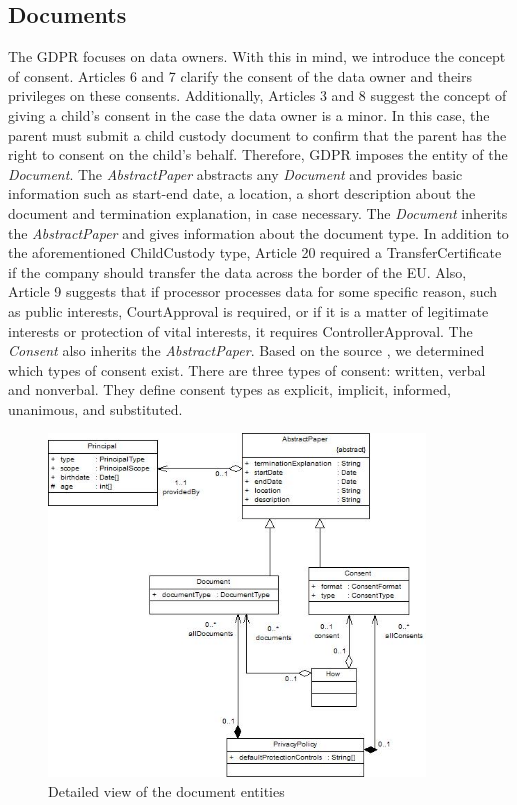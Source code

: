 \documentclass[11pt,english]{article}
\begin{document}
\subsection{Documents}
The GDPR focuses on data owners. With this in mind, we introduce the concept of consent. Articles 6 and 7 clarify the consent of the data owner and theirs privileges on these consents. Additionally, Articles 3 and 8 suggest the concept of giving a child's consent in the case the data owner is a minor. In this case, the parent must submit a child custody document to confirm that the parent has the right to consent on the child's behalf. Therefore, GDPR imposes the entity of the \emph{Document}. \newline The \emph{AbstractPaper} abstracts any \emph{Document} and provides basic information such as start-end date,  a location, a short description about the document and termination explanation, in case necessary. \newline  The \emph{Document} inherits the \emph{AbstractPaper} and gives information about the document type. In addition to the aforementioned ChildCustody type, Article 20 required a TransferCertificate if the company should transfer the data across the border of the EU. Also, Article 9 suggests that if processor processes data for some specific reason, such as public interests, CourtApproval is required, or if it is a matter of legitimate interests or protection of vital interests, it requires ControllerApproval. \newline The \emph{Consent} also inherits the \emph{AbstractPaper}. Based on the source \cite{consent}, we determined which types of consent exist. There are three types of consent: written, verbal and nonverbal. They define consent types as explicit, implicit, informed, unanimous, and substituted.
\begin{figure}[H]
    \centering
    \includegraphics[width=10cm,scale=0.5]{images/document.jpg}
    \caption{Detailed view of the document entities}
    \label{fig:Document}
\end{figure}
\end{document}
